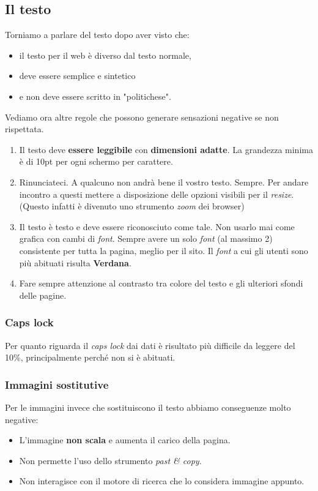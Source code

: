 		\subsection{Il testo}
			Torniamo a parlare del testo dopo aver visto che:
			\begin{itemize}
				\item il testo per il web è diverso dal testo normale,
				\item deve essere semplice e sintetico
				\item e non deve essere scritto in "politichese".
			\end{itemize}
			Vediamo ora altre regole che possono generare sensazioni negative se non rispettata.
			\begin{enumerate}
				\item Il testo deve \textbf{essere leggibile} con \textbf{dimensioni adatte}. La grandezza minima è di 10pt per ogni schermo per carattere.
				\item Rinunciateci. A qualcuno non andrà bene il vostro testo. Sempre. Per andare incontro a questi mettere a disposizione delle opzioni visibili per il \emph{resize}. (Questo infatti è divenuto uno strumento \emph{zoom} dei browser)
				\item Il testo è testo e deve essere riconosciuto come tale. Non usarlo mai come grafica con cambi di \emph{font}. Sempre avere un solo \emph{font} (al massimo 2) consistente per tutta la pagina, meglio per il sito. Il \emph{font} a cui gli utenti sono più abituati risulta \textbf{Verdana}.
				\item Fare sempre attenzione al contrasto tra colore del testo e gli ulteriori sfondi delle pagine.
			\end{enumerate}
			
			\subsubsection{Caps lock}
				Per quanto riguarda il \emph{caps lock} dai dati è risultato più difficile da leggere del 10\%, principalmente perché non si è abituati.
			\subsubsection{Immagini sostitutive}
				Per le immagini invece che sostituiscono il testo abbiamo conseguenze molto negative:
				\begin{itemize}
					\item L'immagine \textbf{non scala} e aumenta il carico della pagina.
					\item Non permette l'uso dello strumento \emph{past \& copy}.
					\item Non interagisce con il motore di ricerca che lo considera immagine appunto. 
				\end{itemize}
				

